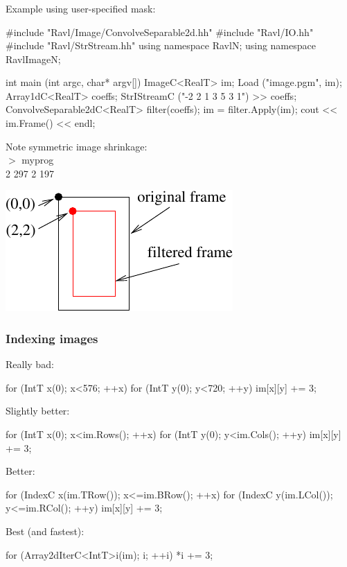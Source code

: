 \documentclass[landscape]{beamer}
\begin{document}
\begin{frame}[fragile]\frametitle{}

Example using user-specified mask:

\begin{Code}
  #include "Ravl/Image/ConvolveSeparable2d.hh"
  #include "Ravl/IO.hh"
  #include "Ravl/StrStream.hh"
  using namespace RavlN;
  using namespace RavlImageN;
  
  int main (int argc, char* argv[]) {
    ImageC<RealT> im;  Load ("image.pgm", im);
    Array1dC<RealT> coeffs;
    StrIStreamC ("-2 2 1 3 5 3 1") >> coeffs;
    ConvolveSeparable2dC<RealT> filter(coeffs);
    im = filter.Apply(im);
    cout << im.Frame() << endl;
  }
\end{Code}

\parbox[b]{0.4\textwidth}{
Note symmetric image shrinkage:\\
{\footnotesize\color{xterm}$>$ myprog\\
2 297 2 197
}}
\includegraphics[scale=0.5]{filter}

\end{frame}
\begin{frame}[fragile]\frametitle{Indexing images}

Really bad:

\begin{Code}
  for (IntT x(0); x<576; ++x)  for (IntT y(0); y<720; ++y)
    im[x][y] += 3;
\end{Code}

\pause Slightly better:

\begin{Code}
  for (IntT x(0); x<im.Rows(); ++x)  for (IntT y(0); y<im.Cols(); ++y)
    im[x][y] += 3;
\end{Code}

\pause Better:

\begin{Code}
  for (IndexC x(im.TRow()); x<=im.BRow(); ++x)
    for (IndexC y(im.LCol()); y<=im.RCol(); ++y)
      im[x][y] += 3;
\end{Code}


\pause Best (and fastest):

\begin{Code}
  for (Array2dIterC<IntT>i(im); i; ++i)
    *i += 3;
\end{Code}

\end{frame}
\end{document}

